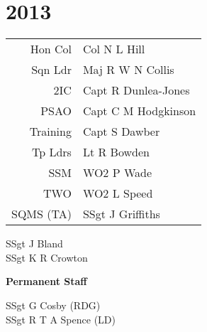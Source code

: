 \chapter*{2013}

\vspace*{20mm}

\begin{center}
  \begin{tabular}{rl}
    Hon Col & Col N L Hill \\
    Sqn Ldr & Maj R W N Collis \\
    2IC & Capt R Dunlea-Jones \\
    PSAO & Capt C M Hodgkinson \\
    Training & Capt S Dawber \\
    Tp Ldrs & Lt R Bowden \\
    SSM & WO2 P Wade \\
    TWO & WO2 L Speed \\
    SQMS (TA) & SSgt J Griffiths \\
  \end{tabular}
\end{center}

\begin{multicols}{2}
  \noindent
  SSgt J Bland \\
  SSgt K R Crowton \\
\end{multicols}

\begin{center}
  \Large
  \textbf{Permanent Staff}
\end{center}

\begin{multicols}{2}
  SSgt G Cosby (RDG) \\
  SSgt R T A Spence (LD) \\
\end{multicols}

